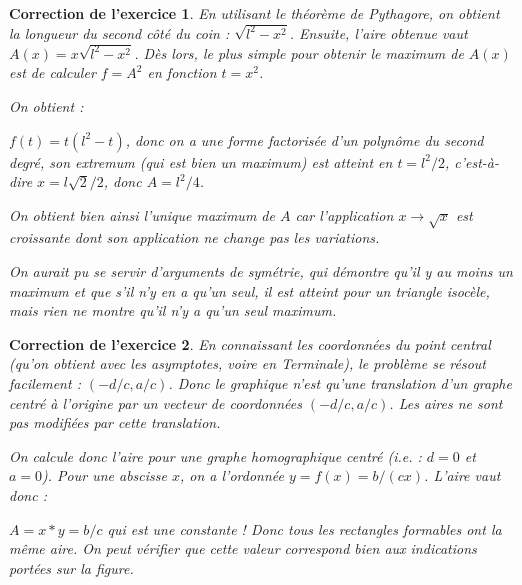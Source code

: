 \documentclass[12pt]{article}
\theoremstyle{break}
\newtheorem{cor}{Correction de l'exercice}
\begin{document}
\begin{cor}
En utilisant le théorème de Pythagore, on obtient la longueur du second côté du coin : $\sqrt{l^2 - x^2}$. Ensuite, l'aire obtenue vaut $A(x) = x \sqrt{l^2 - x^2}$. Dès lors, le plus simple pour obtenir le maximum de $A(x)$ est de calculer $f = A^2$ en fonction $t = x^2$.

On obtient :

$f(t) = t(l^2-t)$, donc on a une forme factorisée d'un polynôme du second degré, son extremum (qui est bien un maximum) est atteint en $t = l^2/2$, c'est-à-dire $x = l \sqrt{2}/2$, donc $A = l^2/4$.

On obtient bien ainsi l'unique maximum de $A$ car l'application $x \rightarrow \sqrt{x}$ est croissante dont son application ne change pas les variations.

On aurait pu se servir d'arguments de symétrie, qui démontre qu'il y au moins un maximum et que s'il n'y en a qu'un seul, il est atteint pour un triangle isocèle, mais rien ne montre qu'il n'y a qu'un seul maximum.
\end{cor}

\begin{cor}
En connaissant les coordonnées du point central (qu'on obtient avec les asymptotes, voire en Terminale), le problème se résout facilement : $(-d/c, a/c)$. Donc le graphique n'est qu'une translation d'un graphe centré à l'origine par un vecteur de coordonnées $(-d/c, a/c)$. Les aires ne sont pas modifiées par cette translation.

On calcule donc l'aire pour une graphe homographique centré (i.e. : $d = 0$ et $a = 0$). Pour une abscisse $x$, on a l'ordonnée $y = f(x) = b/(cx)$. L'aire vaut donc :

$A = x*y = b/c$ qui est une constante ! Donc tous les rectangles formables ont la même aire. On peut vérifier que cette valeur correspond bien aux indications portées sur la figure.
\end{cor}
\end{document}
